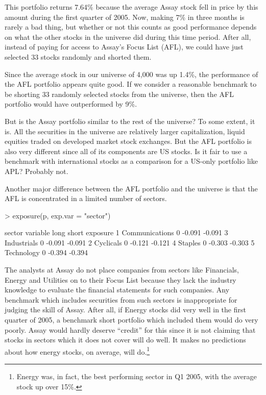 \documentclass{article}
\begin{document}
This portfolio returns 7.64\% because the average Assay stock fell in
price by this amount during the first quarter of 2005. Now, making 7\%
in three months is rarely a bad thing, but whether or not this counts
as good performance depends on what the other stocks in the universe
did during this time period. After all, instead of paying for access
to Assay's Focus List (AFL), we could have just selected 33 stocks
randomly and shorted them.

Since the average stock in our universe of 4,000 was up 1.4\%, the
performance of the AFL portfolio appears quite good. If we consider a
reasonable benchmark to be shorting 33 randomly selected stocks from
the universe, then the AFL portfolio would have outperformed by 9\%.

But is the Assay portfolio similar to the rest of the universe? To
some extent, it is. All the securities in the universe are relatively
larger capitalization, liquid equities traded on developed market
stock exchanges. But the AFL portfolio is also very different since
all of its components are US stocks. Is it fair to use a benchmark
with international stocks as a comparison for a US-only portfolio like
APL? Probably not.

Another major difference between the AFL portfolio and the universe is
that the AFL is concentrated in a limited number of sectors.

\begin{Schunk}
\begin{Sinput}
> exposure(p, exp.var = "sector")
\end{Sinput}
\begin{Soutput}
sector 
        variable long  short exposure
1 Communications    0 -0.091   -0.091
3    Industrials    0 -0.091   -0.091
2      Cyclicals    0 -0.121   -0.121
4        Staples    0 -0.303   -0.303
5     Technology    0 -0.394   -0.394
\end{Soutput}
\end{Schunk}

The analysts at Assay do not place companies from sectors like
Financials, Energy and Utilities on to their Focus List because they
lack the industry knowledge to evaluate the financial statements for
such companies. Any benchmark which includes securities from such
sectors is inappropriate for judging the skill of Assay. After all, if
Energy stocks did very well in the first quarter of 2005, a benchmark
short portfolio which included them would do very poorly. Assay would
hardly deserve ``credit'' for this since it is not claiming that
stocks in sectors which it does not cover will do well. It makes no
predictions about how energy stocks, on average, will
do.\footnote{Energy was, in fact, the best performing sector in Q1
  2005, with the average stock up over 15\%.}
\end{document}
